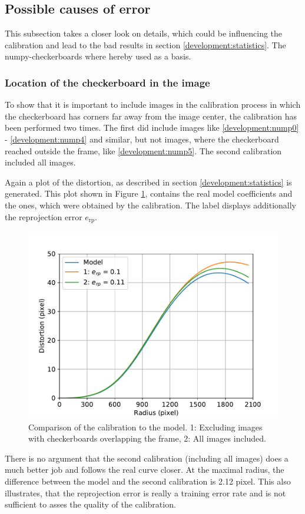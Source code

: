 \subsection{Possible causes of error}
This subsection takes a closer look on details, which could be influencing the calibration and lead to the bad results in section \ref{development:statistics}.
The numpy-checkerboards where hereby used as a basis.

\subsubsection{Location of the checkerboard in the image}
To show that it is important to include images in the calibration process in which the checkerboard has corners far away from the image center, the calibration has been performed two times.
The first did include images like \ref{development:nump0} - \ref{development:nump4} and similar, but not images, where the checkerboard reached outside the frame, like \ref{development:nump5}.
The second calibration included all images.

Again a plot of the distortion, as described in section \ref{development:statistics} is generated.
This plot shown in Figure \ref{development:loc}, contains the real model coefficients and the ones, which were obtained by the calibration.
The label displays additionally the reprojection error $e_{\text{rp}}$.
\begin{figure}
	\centering
	\includegraphics[width=0.9\linewidth]{3-development/calibration/images/location.pdf}
	\caption{Comparison of the calibration to the model. 1: Excluding images with checkerboards overlapping the frame, 2: All images included. \label{development:loc}}
\end{figure}
There is no argument that the second calibration (including all images) does a much better job and follows the real curve closer.
At the maximal radius, the difference between the model and the second calibration is 2.12 pixel.
This also illustrates, that the reprojection error is really a training error rate and is not sufficient to asses the quality of the calibration.

